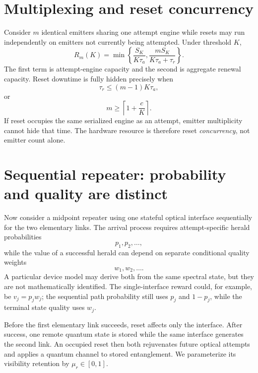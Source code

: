\documentclass[aps,prx,reprint,superscriptaddress,nofootinbib,longbibliography,floatfix]{revtex4-2}
\begin{document}
\section{Multiplexing and reset concurrency}
Consider $m$ identical emitters sharing one attempt engine while resets may run independently on emitters not currently being attempted. Under threshold $K$,
\begin{equation}
\boxed{R_m(K)=\min\left\{\frac{S_K}{K\tau_a},\frac{mS_K}{K\tau_a+\tau_r}\right\}.}
\end{equation}
The first term is attempt-engine capacity and the second is aggregate renewal capacity. Reset downtime is fully hidden precisely when
\begin{equation}
\tau_r\le(m-1)K\tau_a,
\end{equation}
or
\begin{equation}
m\ge\left\lceil1+\frac{c}{K}\right\rceil.
\end{equation}
If reset occupies the same serialized engine as an attempt, emitter multiplicity cannot hide that time. The hardware resource is therefore reset \emph{concurrency}, not emitter count alone.

\section{Sequential repeater: probability and quality are distinct}
Now consider a midpoint repeater using one stateful optical interface sequentially for the two elementary links. The arrival process requires attempt-specific herald probabilities
\begin{equation}
p_1,p_2,\ldots,
\end{equation}
while the value of a successful herald can depend on separate conditional quality weights
\begin{equation}
w_1,w_2,\ldots.
\end{equation}
A particular device model may derive both from the same spectral state, but they are not mathematically identified. The single-interface reward could, for example, be $v_j=p_jw_j$; the sequential path probability still uses $p_j$ and $1-p_j$, while the terminal state quality uses $w_j$.

Before the first elementary link succeeds, reset affects only the interface. After success, one remote quantum state is stored while the same interface generates the second link. An occupied reset then both rejuvenates future optical attempts and applies a quantum channel to stored entanglement. We parameterize its visibility retention by $\mu_r\in[0,1]$.
\end{document}
